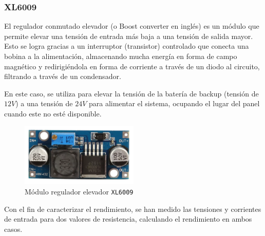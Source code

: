 \subsubsection{XL6009}

El regulador conmutado elevador (o Boost converter en inglés) es un módulo que permite elevar una tensión de entrada más baja a una tensión de salida mayor. Esto se logra gracias a un interruptor (transistor) controlado que conecta una bobina a la alimentación, almacenando mucha energía en forma de campo magnético y redirigiéndola en forma de corriente a través de un diodo al circuito, filtrando a través de un condensador.\cite{xlsemi400KHz604}

En este caso, se utiliza para elevar la tensión de la batería de backup (tensión de $12 V$) a una tensión de $24 V$ para alimentar el sistema, ocupando el lugar del panel cuando este no esté disponible.

\begin{figure}[H]
    \centering
    \includegraphics[width=0.5\textwidth]{images/2-hardware/componentes/XL6009.png}
    \caption{Módulo regulador elevador \texttt{XL6009}}
    \label{fig:hardware/modulos/xl6009}
\end{figure}

Con el fin de caracterizar el rendimiento, se han medido las tensiones y corrientes de entrada para dos valores de resistencia, calculando el rendimiento en ambos casos.

